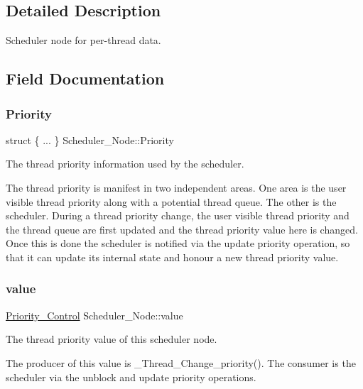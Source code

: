 \subsection{Detailed Description}
Scheduler node for per-\/thread data. 

\subsection{Field Documentation}
\mbox{\label{structScheduler__Node_aad013001a975d1ea432ff3ef76a24c46}} 
\subsubsection{\texorpdfstring{Priority}{Priority}}
{\footnotesize\ttfamily struct \{ ... \}   Scheduler\+\_\+\+Node\+::\+Priority}



The thread priority information used by the scheduler. 

The thread priority is manifest in two independent areas. One area is the user visible thread priority along with a potential thread queue. The other is the scheduler. During a thread priority change, the user visible thread priority and the thread queue are first updated and the thread priority value here is changed. Once this is done the scheduler is notified via the update priority operation, so that it can update its internal state and honour a new thread priority value. \mbox{\label{structScheduler__Node_a0223e20a233540fd2a75e50e2141a2b7}} 
\subsubsection{\texorpdfstring{value}{value}}
{\footnotesize\ttfamily \mbox{\hyperlink{group__RTEMSScorePriority_ga59d02b58072d31a9a1cfe644557aefe2}{Priority\+\_\+\+Control}} Scheduler\+\_\+\+Node\+::value}



The thread priority value of this scheduler node. 

The producer of this value is \+\_\+\+Thread\+\_\+\+Change\+\_\+priority(). The consumer is the scheduler via the unblock and update priority operations.


